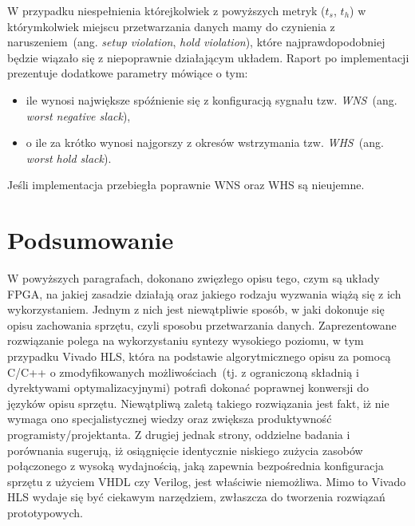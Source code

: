 \begin{itemize}
W przypadku niespełnienia którejkolwiek z powyższych metryk ($t_s$, $t_h$) w którymkolwiek miejscu przetwarzania danych mamy do czynienia z naruszeniem~(ang. \textit{setup violation}, \textit{hold violation}), które najprawdopodobniej będzie wiązało się z niepoprawnie działającym układem. Raport po implementacji prezentuje dodatkowe parametry mówiące o tym:
\begin{itemize}
\item ile wynosi największe spóźnienie się z konfiguracją sygnału tzw. \textit{WNS}~(ang. \textit{worst negative slack}),
\item o ile za krótko wynosi najgorszy z okresów wstrzymania tzw. \textit{WHS}~(ang. \textit{worst hold slack}).
\end{itemize}
Jeśli implementacja przebiegła poprawnie WNS oraz WHS są nieujemne.

\end{itemize}


\section*{Podsumowanie}
W powyższych paragrafach, dokonano zwięzłego opisu tego, czym są układy FPGA, na jakiej zasadzie działają oraz jakiego rodzaju wyzwania wiążą się z ich wykorzystaniem. Jednym z nich jest niewątpliwie sposób, w jaki dokonuje się opisu zachowania sprzętu, czyli sposobu przetwarzania danych. Zaprezentowane rozwiązanie polega na wykorzystaniu syntezy wysokiego poziomu, w tym przypadku Vivado HLS, która na podstawie algorytmicznego opisu za pomocą C/C++ o zmodyfikowanych możliwościach~(tj. z ograniczoną składnią i dyrektywami optymalizacyjnymi) potrafi dokonać poprawnej konwersji do języków opisu sprzętu. Niewątpliwą zaletą takiego rozwiązania jest fakt, iż nie wymaga ono specjalistycznej wiedzy oraz zwiększa produktywność programisty/projektanta. Z drugiej jednak strony, oddzielne badania i porównania sugerują, iż osiągnięcie identycznie niskiego zużycia zasobów połączonego z wysoką wydajnością, jaką zapewnia bezpośrednia konfiguracja sprzętu z użyciem VHDL czy Verilog, jest właściwie niemożliwa. Mimo to Vivado HLS wydaje się być ciekawym narzędziem, zwłaszcza do tworzenia rozwiązań prototypowych.
